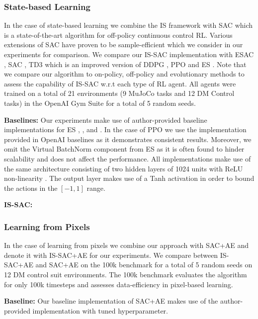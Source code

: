\documentclass{article}
\begin{document}
\subsubsection{State-based Learning}
In the case of state-based learning we combine the IS framework with SAC \cite{sac} which is a state-of-the-art algorithm for off-policy continuous control RL. Various extensions of SAC have proven to be sample-efficient \cite{esac} which we consider in our experiments for comparison. We compare our IS-SAC implementation with ESAC \cite{esac}, SAC \cite{sac}, TD3 \cite{td3} which is an improved version of DDPG \cite{ddpg}, PPO \cite{ppo} and ES \cite{es}. Note that we compare our algorithm to on-policy, off-policy and evolutionary methods to assess the capability of IS-SAC w.r.t each type of RL agent. All agents were trained on a total of 21 environments (9 MuJoCo tasks and 12 DM Control tasks) in the OpenAI Gym Suite \cite{gym} for a total of 5 random seeds.

\textbf{Baselines:} Our experiments make use of author-provided baseline implementations for ES \cite{es}, \cite{td3}, \cite{sac} and \cite{esac}. In the case of PPO \cite{ppo} we  use the implementation provided in OpenAI baselines \cite{baselines} as it demonstrates consistent results. Moreover, we omit the Virtual BatchNorm \cite{vb} component from ES as it is often found to hinder scalability and does not affect the performance. All implementations make use of the same architecture consisting of two hidden layers of 1024 units with ReLU non-linearity \cite{relu}. The output layer makes use of a Tanh activation in order to bound the actions in the $[-1,1]$ range.

\textbf{IS-SAC:}

\subsubsection{Learning from Pixels}
In the case of learning from pixels we combine our approach with SAC+AE \cite{sacae} and denote it with IS-SAC+AE for our experiments. We compare between IS-SAC+AE and SAC+AE on the 100k benchmark \cite{curl} for a total of 5 random seeds on 12 DM control suit environments. The 100k benchmark evaluates the algorithm for only 100k timesteps and assesses data-efficiency in pixel-based learning. 

\textbf{Baseline:} Our baseline implementation of SAC+AE makes use of the author-provided implementation \cite{sacae} with tuned hyperparameter.  
\end{document}
